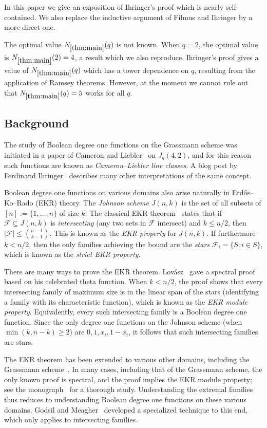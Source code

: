\documentclass{article}
\theoremstyle{definition}
\providecommand{\Nmain}{N_{\ref{thm:main}}}
\begin{document}
In this paper we give an exposition of Ihringer's proof which is nearly self-contained. We also replace the inductive argument of Filmus and Ihringer by a more direct one.

The optimal value $\Nmain(q)$ is not known. When $q = 2$, the optimal value is $\Nmain(2) = 4$, a result which we also reproduce. Ihringer's proof gives a value of $\Nmain(q)$ which has a tower dependence on $q$, resulting from the application of Ramsey theorems. However, at the moment we cannot rule out that $\Nmain(q) = 5$ works for all $q$.

\subsection{Background}
\label{sec:background}

The study of Boolean degree one functions on the Grassmann scheme was initiated in a paper of Cameron and Liebler~\cite{CL82} on $J_q(4,2)$, and for this reason such functions are known as \emph{Cameron--Liebler line classes}. A blog post by Ferdinand Ihringer~\cite{IhringerBlog} describes many other interpretations of the same concept.

Boolean degree one functions on various domains also arise naturally in Erd\H{o}s--Ko--Rado (EKR) theory. The \emph{Johnson scheme} $J(n,k)$ is the set of all subsets of $[n] := \{1,\dots,n\}$ of size $k$. The classical EKR theorem~\cite{EKR61} states that if $\mathcal{F} \subseteq J(n,k)$ is \emph{intersecting} (any two sets in $\mathcal{F}$ intersect) and $k \leq n/2$, then $|\mathcal{F}| \leq \binom{n-1}{k-1}$. This is known as the \emph{EKR property} for $J(n,k)$. If furthermore $k < n/2$, then the only families achieving the bound are the \emph{stars} $\mathcal{F}_i = \{ S : i \in S \}$, which is known as the \emph{strict EKR property}.

There are many ways to prove the EKR theorem. Lov\'asz~\cite{Lovasz79} gave a spectral proof based on his celebrated theta function. When $k < n/2$, the proof shows that every intersecting family of maximum size is in the linear span of the stars (identifying a family with its characteristic function), which is known as the \emph{EKR module property}. Equivalently, every such intersecting family is a Boolean degree one function. Since the only degree one functions on the Johnson scheme (when $\min(k,n-k) \ge 2$) are $0, 1, x_i, 1-x_i$, it follows that such intersecting families are stars.

The EKR theorem has been extended to various other domains, including the Grassmann scheme~\cite{FW86}. In many cases, including that of the Grassmann scheme, the only known proof is spectral, and the proof implies the EKR module property; see the monograph~\cite{GM16} for a thorough study. Understanding the extremal families thus reduces to understanding Boolean degree one functions on these various domains. Godsil and Meagher~\cite{GM09} developed a specialized technique to this end, which only applies to intersecting families.
\end{document}
